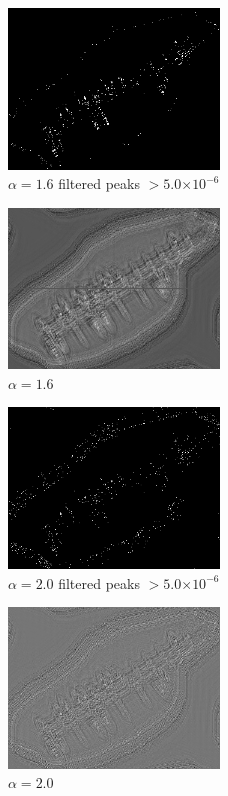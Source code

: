 \documentclass[12pt]{article}
\providecommand{\e}[1]{\ensuremath{\times 10^{#1}}}
\begin{document}
\begin{figure}
\centering
\includegraphics[width=0.50\textwidth]{boats_a16_peak5e-6.png}
\caption{\(\alpha=1.6\) filtered peaks \(> 5.0\e{-6}\)}
\label{a16peak}
\end{figure}

\begin{figure}
\centering
\includegraphics[width=0.50\textwidth]{boats_a16.png}
\caption{\(\alpha=1.6\)}
\label{a16}
\end{figure}

\begin{figure}
\centering
\includegraphics[width=0.50\textwidth]{boats_a20_peak5e-6.png}
\caption{\(\alpha=2.0\) filtered peaks \(> 5.0\e{-6}\)}
\label{a20peak}
\end{figure}

\begin{figure}
\centering
\includegraphics[width=0.50\textwidth]{boats_a20.png}
\caption{\(\alpha=2.0\)}
\label{a20}
\end{figure}
\end{document}

